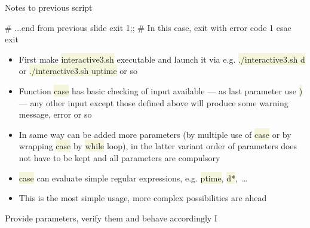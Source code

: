 \documentclass[compress, xelatex, 11pt, xcolor=svgnames, aspectratio=169, url={hyphens, lowtilde}]{beamer}
\renewcommand{\texttt}[1]{\colorbox{Beige}{{\ttfamily #1}}}
\begin{document}
\begin{frame}[fragile]{Notes to previous script}
	\begin{bashcode}
    # ...end from previous slide
        exit 1;; # In this case, exit with error code 1
      esac
    exit
	\end{bashcode}
	\begin{itemize}
		\item First make \texttt{interactive3.sh} executable and launch it via e.g. \texttt{./interactive3.sh d} or \texttt{./interactive3.sh uptime} or so
		\item Function \texttt{case} has basic checking of input available --- as last parameter use \texttt{*)} --- any other input except those defined above will produce some warning message, error or so
		\item In same way can be added more parameters (by multiple use of \texttt{case} or by wrapping \texttt{case} by \texttt{while} loop), in the latter variant order of parameters does not have to be kept and all parameters are compulsory
		\item \texttt{case} can evaluate simple regular expressions, e.g. \texttt{[Uu]ptime}, \texttt{d*},~\ldots
		\item This is the most simple usage, more complex possibilities are ahead
	\end{itemize}
\end{frame}

\begin{frame}[fragile]{Provide parameters, verify them and behave accordingly I}
\end{frame}
\end{document}

